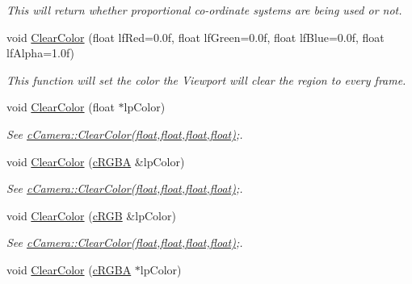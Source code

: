 \begin{DoxyCompactItemize}
\begin{DoxyCompactList}\small\item\em This will return whether proportional co-\/ordinate systems are being used or not. \end{DoxyCompactList}\item 
void \hyperlink{classc_viewport_control_ac3cee84c15d6b7bb35daf33a95a41f08}{ClearColor} (float lfRed=0.0f, float lfGreen=0.0f, float lfBlue=0.0f, float lfAlpha=1.0f)
\begin{DoxyCompactList}\small\item\em This function will set the color the Viewport will clear the region to every frame. \end{DoxyCompactList}\item 
\hypertarget{classc_viewport_control_a112989f88c6b4aa600df131df256e95a}{
void \hyperlink{classc_viewport_control_a112989f88c6b4aa600df131df256e95a}{ClearColor} (float $\ast$lpColor)}
\label{classc_viewport_control_a112989f88c6b4aa600df131df256e95a}

\begin{DoxyCompactList}\small\item\em See \hyperlink{classc_viewport_control_ac3cee84c15d6b7bb35daf33a95a41f08}{cCamera::ClearColor(float,float,float,float)};. \end{DoxyCompactList}\item 
\hypertarget{classc_viewport_control_a069d58104acef910adada1ab30844171}{
void \hyperlink{classc_viewport_control_a069d58104acef910adada1ab30844171}{ClearColor} (\hyperlink{classc_r_g_b_a}{cRGBA} \&lpColor)}
\label{classc_viewport_control_a069d58104acef910adada1ab30844171}

\begin{DoxyCompactList}\small\item\em See \hyperlink{classc_viewport_control_ac3cee84c15d6b7bb35daf33a95a41f08}{cCamera::ClearColor(float,float,float,float)};. \end{DoxyCompactList}\item 
\hypertarget{classc_viewport_control_aaac44c413f8cc01ff049fe1579d5c666}{
void \hyperlink{classc_viewport_control_aaac44c413f8cc01ff049fe1579d5c666}{ClearColor} (\hyperlink{classc_r_g_b}{cRGB} \&lpColor)}
\label{classc_viewport_control_aaac44c413f8cc01ff049fe1579d5c666}

\begin{DoxyCompactList}\small\item\em See \hyperlink{classc_viewport_control_ac3cee84c15d6b7bb35daf33a95a41f08}{cCamera::ClearColor(float,float,float,float)};. \end{DoxyCompactList}\item 
\hypertarget{classc_viewport_control_aa107f9cf8534ef74ca3b01bcd9014489}{
void \hyperlink{classc_viewport_control_aa107f9cf8534ef74ca3b01bcd9014489}{ClearColor} (\hyperlink{classc_r_g_b_a}{cRGBA} $\ast$lpColor)}
\label{classc_viewport_control_aa107f9cf8534ef74ca3b01bcd9014489}


\end{DoxyCompactItemize}
